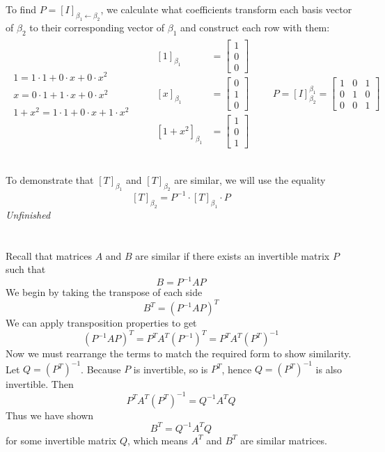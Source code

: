 \documentclass[]{article}
\newcommand{\bmat}[1]{\begin{bmatrix}#1\end{bmatrix}}
\begin{document}
	\subsection{}
	To find $P = [I]_{\beta_1\leftarrow\beta_2}$, we calculate what coefficients transform each basis vector of $\beta_2$ to their corresponding vector of $\beta_1$ and construct each row with them: 
	\begin{gather*}
		\begin{aligned}
			1 = 1 \cdot 1 + 0 \cdot x + 0 \cdot x^2\\\\
            x = 0 \cdot 1 + 1 \cdot x + 0 \cdot x^2\\\\
            1 + x^2 = 1 \cdot 1 + 0 \cdot x + 1 \cdot x^2
		\end{aligned}
		\qquad
		\begin{aligned}
			[1]_{\beta_1} &= \bmat{1\\0\\0}\\
			[x]_{\beta_1} &= \bmat{0\\1\\0}\\
			[1 + x^2]_{\beta_1} &= \bmat{1\\0\\1}
		\end{aligned}
		\qquad
		P = [I]_{\beta_2}^{\beta_1} = \bmat{1&0&1\\0&1&0\\0&0&1}
	\end{gather*}
	\subsection{}
	To demonstrate that $[T]_{\beta_1}$ and $[T]_{\beta_2}$ are similar, we will use the equality \[[T]_{\beta_2} = P^{-1} \cdot [T]_{\beta_1} \cdot P\]
        \textit{Unfinished}

    \section{}
    Recall that matrices $A$ and $B$ are similar if there exists an invertible matrix $P$ such that
    \[ B = P^{-1}AP \]
    We begin by taking the transpose of each side
    \[ B^T = (P^{-1}AP)^T \]
    We can apply transposition properties to get
    \[ (P^{-1}AP)^T = P^TA^T(P^{-1})^T = P^TA^T(P^T)^{-1}\]
    Now we must rearrange the terms to match the required form to show similarity. Let $Q = (P^T)^{-1}$. Because $P$ is invertible, so is $P^T$, hence $Q = (P^T)^{-1}$ is also invertible. Then
    \[ P^TA^T(P^T)^{-1} = Q^{-1}A^TQ \]
    Thus we have shown
    \[ B^T = Q^{-1}A^TQ \]
    for some invertible matrix $Q$, which means $A^T$ and $B^T$ are similar matrices.
\end{document}
